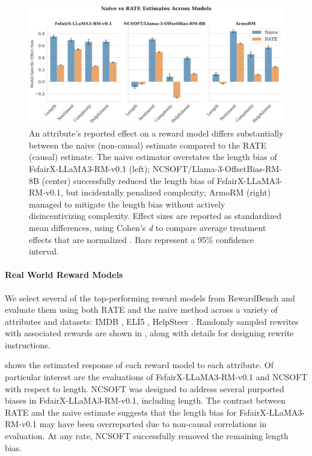 \documentclass{article}
\begin{document}
\begin{figure}[t]
  \centering
  \includegraphics[width=\linewidth]{figures/naive.png}
  \caption{An attribute's reported effect on a reward model differs substantially between the naive (non-causal) estimate compared to the RATE (causal) estimate. The naive estimator overstates the length bias of FsfairX-LLaMA3-RM-v0.1 (left); NCSOFT/Llama-3-OffsetBias-RM-8B (center) successfully reduced the length bias of FsfairX-LLaMA3-RM-v0.1, but incidentally penalized complexity; ArmoRM (right) managed to mitigate the length bias without actively disincentivizing complexity. Effect sizes are reported as standardized mean differences, using Cohen's \emph{d} to compare average treatment effects that are normalized \citep{faraone2008interpreting}. Bars represent a 95\% confidence interval.}
  \label{fig:naive}
\end{figure}

\paragraph{Real World Reward Models}
We select several of the top-performing reward models from RewardBench \citep{lambert2024rewardbenchevaluatingrewardmodels} and evaluate them using both RATE and the naive method across a variety of attributes and datasets: IMDB \citep{maas-EtAl:2011:ACL-HLT2011}, ELI5 \citep{eli5_lfqa}, HelpSteer \citep{wang2023helpsteer}. Randomly sampled rewrites with associated rewards are shown in , along with details for designing rewrite instructions.

 shows the estimated response of each reward model to each attribute. Of particular interest are the evaluations of FsfairX-LLaMA3-RM-v0.1 \citep{dong2023raft} and NCSOFT \citep{park2024offsetbias} with respect to length. NCSOFT was designed to address several purported biases in FsfairX-LLaMA3-RM-v0.1, including length. 
The contrast between RATE and the naive estimate suggests that the length bias for FsfairX-LLaMA3-RM-v0.1 may have been overreported due to non-causal correlations in evaluation. At any rate, NCSOFT successfully removed the remaining length bias.
\end{document}
